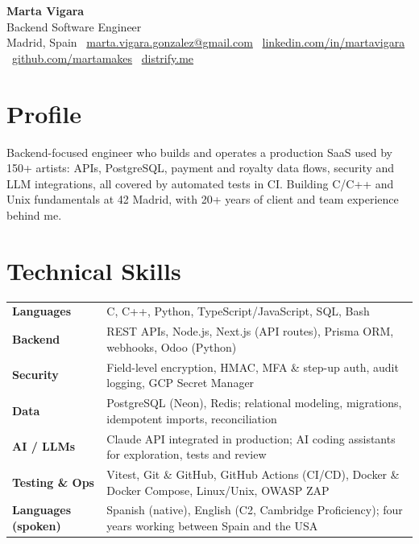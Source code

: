 \documentclass[10pt,a4paper]{article}
\begin{document}
\begin{center}
  {\fontsize{20}{22}\selectfont\bfseries Marta Vigara}\\[0.15em]
  {\large\color{accent} Backend Software Engineer}\\[0.25em]
  {\small
  Madrid, Spain \textperiodcentered\
  \href{mailto:marta.vigara.gonzalez@gmail.com}{marta.vigara.gonzalez@gmail.com} \textperiodcentered\
  \href{https://linkedin.com/in/martavigara}{linkedin.com/in/martavigara} \textperiodcentered\
  \href{https://github.com/martamakes}{github.com/martamakes} \textperiodcentered\
  \href{https://distrify.me}{distrify.me}}
\end{center}

\section{Profile}
Backend-focused engineer who builds and operates a production SaaS used by 150+ artists: APIs, PostgreSQL,
payment and royalty data flows, security and LLM integrations, all covered by automated tests in CI.
Building C/C++ and Unix fundamentals at 42 Madrid, with 20+ years of client and team experience behind me.

\section{Technical Skills}
\begin{tabularx}{\linewidth}{@{}p{3.3cm}X@{}}
\textbf{Languages}   & C, C++, Python, TypeScript/JavaScript, SQL, Bash \\
\textbf{Backend}     & REST APIs, Node.js, Next.js (API routes), Prisma ORM, webhooks, Odoo (Python) \\
\textbf{Security}    & Field-level encryption, HMAC, MFA \& step-up auth, audit logging, GCP Secret Manager \\
\textbf{Data}        & PostgreSQL (Neon), Redis; relational modeling, migrations, idempotent imports, reconciliation \\
\textbf{AI / LLMs}   & Claude API integrated in production; AI coding assistants for exploration, tests and review \\
\textbf{Testing \& Ops} & Vitest, Git \& GitHub, GitHub Actions (CI/CD), Docker \& Docker Compose, Linux/Unix, OWASP ZAP \\
\textbf{Languages (spoken)} & Spanish (native), English (C2, Cambridge Proficiency); four years working between Spain and the USA \\
\end{tabularx}
\end{document}
